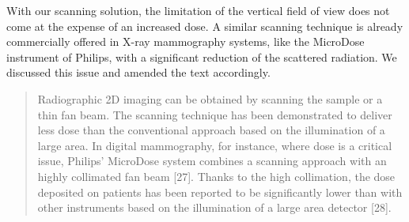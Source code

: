 \documentclass[a4paper,english]{scrartcl}
\begin{document}
With our scanning solution, the limitation of the vertical field of view does not come at the expense of
an increased dose. 
A similar scanning technique is already commercially offered in X-ray
mammography systems, like the MicroDose instrument of Philips, with a
significant reduction of the scattered radiation. We discussed this issue and
amended the text accordingly.
\begin{quote}
 Radiographic 2D imaging can be obtained by scanning the sample or a
thin fan beam. The scanning technique has been demonstrated to deliver less dose than the
conventional approach based on the illumination of a large area. In digital mammography,
for instance, where dose is a critical issue, Philips’ MicroDose system combines a scanning
approach with an highly collimated fan beam [27]. Thanks to the high collimation, the dose
deposited on patients has been reported to be significantly lower than with other instruments
based on the illumination of a large area detector [28]. 
\end{quote}
\end{document}
